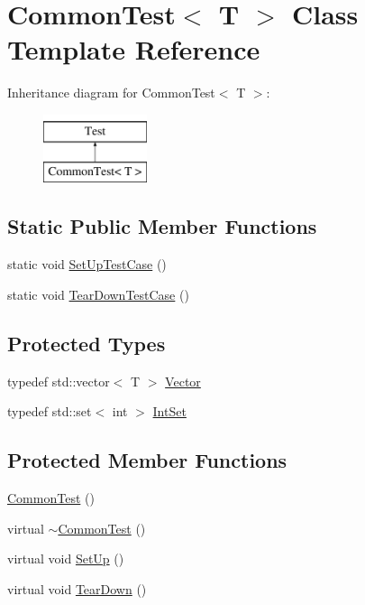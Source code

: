 \hypertarget{classCommonTest}{\section{\-Common\-Test$<$ \-T $>$ \-Class \-Template \-Reference}
\label{de/d53/classCommonTest}
}
\-Inheritance diagram for \-Common\-Test$<$ \-T $>$\-:\begin{figure}[H]
\begin{center}
\leavevmode
\includegraphics[height=2.000000cm]{de/d53/classCommonTest}
\end{center}
\end{figure}
\subsection*{\-Static \-Public \-Member \-Functions}
\begin{DoxyCompactItemize}
\item 
static void \hyperlink{classCommonTest_aad8181b222f27240e9f07dcb6e620fa3}{\-Set\-Up\-Test\-Case} ()
\item 
static void \hyperlink{classCommonTest_aaff0dc66f57f643a49ad3dd6bcb56916}{\-Tear\-Down\-Test\-Case} ()
\end{DoxyCompactItemize}
\subsection*{\-Protected \-Types}
\begin{DoxyCompactItemize}
\item 
typedef std\-::vector$<$ \-T $>$ \hyperlink{classCommonTest_a9c118b726bd053a793bf9d3c7283e3b7}{\-Vector}
\item 
typedef std\-::set$<$ int $>$ \hyperlink{classCommonTest_a073e9926e51139db1741b866f0bcdd48}{\-Int\-Set}
\end{DoxyCompactItemize}
\subsection*{\-Protected \-Member \-Functions}
\begin{DoxyCompactItemize}
\item 
\hyperlink{classCommonTest_a4e6bfdb1ae85a08c774e9074b547d5a3}{\-Common\-Test} ()
\item 
virtual \hyperlink{classCommonTest_a43deb0f8d0c0fb7076ac083db6557339}{$\sim$\-Common\-Test} ()
\item 
virtual void \hyperlink{classCommonTest_a901706a587f9ae84df8b2395fbe759cb}{\-Set\-Up} ()
\item 
virtual void \hyperlink{classCommonTest_a870a092058305911f3d42df45dd657e5}{\-Tear\-Down} ()
\end{DoxyCompactItemize}
